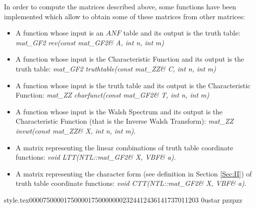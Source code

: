 \begin{samepage}
In order to compute the matrices described above, some functions have been
implemented which allow to obtain some of these matrices from other matrices: 
\begin{itemize}
\item A function whose input is an $ANF$ table and its output is the truth table: \textsl{mat\_GF2 rev(const mat\_GF2\& A, int n, int m)}
\item A function whose input is the Characteristic Function and its output is the truth table: \textsl{mat\_GF2 truthtable(const mat\_ZZ\& C, int n, int m)}
\item A function whose input is the truth table and its output is
the Characteristic Function: \textsl{mat\_ZZ charfunct(const mat\_GF2\& T, int
  n, int m)}
\item A function whose input is the Walsh Spectrum and its output is
the Characteristic Function (that is the Inverse Walsh Transform): \textsl{mat\_ZZ invwt(const mat\_ZZ\& X, int n,
  int m)}.
\item A matrix representing the linear combinations of truth table coordinate functions: \textsl{void LTT(NTL::mat\_GF2\& X, VBF\& a)}.
\item A matrix representing the character form (see definition in Section
  \ref{Sec:II}) of truth table coordinate functions: \textsl{void CTT(NTL::mat\_GF2\& X, VBF\& a)}.

\end{itemize}
\end{samepage}





                                                                                                                                                                                                                                                                                                                                                                                                                                                                                                   style.tex                                                                                           0000750 0001750 0001750 00000023244 12436141737 011203  0                                                                                                    ustar   pzz                             pzz                                                                                                                                                                                                                    %

